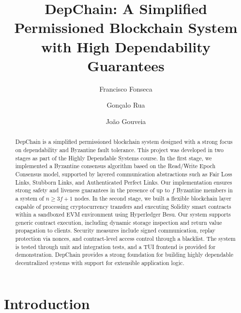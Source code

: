 \documentclass[runningheads]{llncs}
\begin{document}
%
\title{DepChain: A Simplified Permissioned Blockchain System with High Dependability Guarantees}
%
%
\author{Francisco Fonseca \and
Gonçalo Rua \and
João Gouveia}
%
%
%
\maketitle              %
%
\begin{abstract}
DepChain is a simplified permissioned blockchain system designed with a strong focus on dependability and Byzantine fault tolerance. This project was developed in two stages as part of the Highly Dependable Systems course. In the first stage, we implemented a Byzantine consensus algorithm based on the Read/Write Epoch Consensus model, supported by layered communication abstractions such as Fair Loss Links, Stubborn Links, and Authenticated Perfect Links. Our implementation ensures strong safety and liveness guarantees in the presence of up to \(f\) Byzantine members in a system of \(n \geq 3f + 1\) nodes. In the second stage, we built a flexible blockchain layer capable of processing cryptocurrency transfers and executing Solidity smart contracts within a sandboxed EVM environment using Hyperledger Besu. Our system supports generic contract execution, including dynamic storage inspection and return value propagation to clients. Security measures include signed communication, replay protection via nonces, and contract-level access control through a blacklist. The system is tested through unit and integration tests, and a TUI frontend is provided for demonstration. DepChain provides a strong foundation for building highly dependable decentralized systems with support for extensible application logic.

\end{abstract}

%
%
%
%

\section{Introduction}
\end{document}
